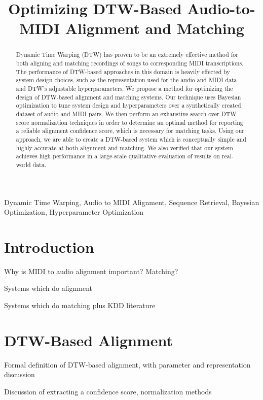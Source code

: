 \documentclass{article}
\title{Optimizing DTW-Based Audio-to-MIDI Alignment and Matching}
\begin{document}
\maketitle

\begin{abstract}
Dynamic Time Warping (DTW) has proven to be an extremely effective method for both aligning and matching recordings of songs to corresponding MIDI transcriptions.
The performance of DTW-based approaches in this domain is heavily effected by system design choices, such as the representation used for the audio and MIDI data and DTW's adjustable hyperparameters.
We propose a method for optimizing the design of DTW-based alignment and matching systems.
Our technique uses Bayesian optimization to tune system design and hyperparameters over a synthetically created dataset of audio and MIDI pairs.
We then perform an exhaustive search over DTW score normalization techniques in order to determine an optimal method for reporting a reliable alignment confidence score, which is necessary for matching tasks.
Using our approach, we are able to create a DTW-based system which is conceptually simple and highly accurate at both alignment and matching.
We also verified that our system achieves high performance in a large-scale qualitative evaluation of results on real-world data.
\end{abstract}

\begin{keywords}
Dynamic Time Warping, Audio to MIDI Alignment, Sequence Retrieval, Bayesian Optimization, Hyperparameter Optimization
\end{keywords}

\section{Introduction}
\label{sec:intro}

Why is MIDI to audio alignment important?  Matching?

Systems which do alignment

Systems which do matching \cite{hu2003polyphonic} plus KDD literature

\section{DTW-Based Alignment}

Formal definition of DTW-based alignment, with parameter and representation discussion

Discussion of extracting a confidence score, normalization methods
\end{document}
